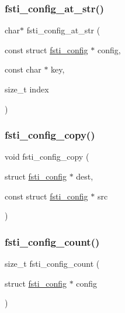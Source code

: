 \mbox{\label{fsti-config_8c_aa51f915ff212933ab1b10a22b82b1464}} 
\subsubsection{\texorpdfstring{fsti\+\_\+config\+\_\+at\+\_\+str()}{fsti\_config\_at\_str()}}
{\footnotesize\ttfamily char$\ast$ fsti\+\_\+config\+\_\+at\+\_\+str (\begin{DoxyParamCaption}\item[{const struct \mbox{\hyperlink{structfsti__config}{fsti\+\_\+config}} $\ast$}]{config,  }\item[{const char $\ast$}]{key,  }\item[{size\+\_\+t}]{index }\end{DoxyParamCaption})}

\mbox{\label{fsti-config_8c_a634d47df34013cf7bba0c3dc67d8e45f}} 
\subsubsection{\texorpdfstring{fsti\+\_\+config\+\_\+copy()}{fsti\_config\_copy()}}
{\footnotesize\ttfamily void fsti\+\_\+config\+\_\+copy (\begin{DoxyParamCaption}\item[{struct \mbox{\hyperlink{structfsti__config}{fsti\+\_\+config}} $\ast$}]{dest,  }\item[{const struct \mbox{\hyperlink{structfsti__config}{fsti\+\_\+config}} $\ast$}]{src }\end{DoxyParamCaption})}

\mbox{\label{fsti-config_8c_a508022bb109124636ed4c7e0002c2c08}} 
\subsubsection{\texorpdfstring{fsti\+\_\+config\+\_\+count()}{fsti\_config\_count()}}
{\footnotesize\ttfamily size\+\_\+t fsti\+\_\+config\+\_\+count (\begin{DoxyParamCaption}\item[{struct \mbox{\hyperlink{structfsti__config}{fsti\+\_\+config}} $\ast$}]{config }\end{DoxyParamCaption})}

